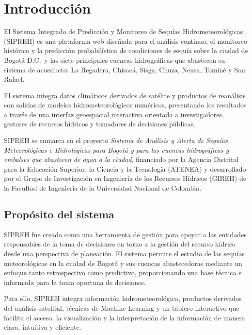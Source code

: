 \chapter{Introducción}
\label{ch:introduccion}

El Sistema Integrado de Predicción y Monitoreo de Sequías Hidrometeorológicas (SIPREH) es una plataforma web diseñada para el análisis continuo, el monitoreo histórico y la predicción probabilística de condiciones de sequía sobre la ciudad de Bogotá D.C.\ y las siete principales cuencas hidrográficas que abastecen su sistema de acueducto: La Regadera, Chisacá, Sisga, Chuza, Neusa, Tominé y San Rafael.

El sistema integra datos climáticos derivados de satélite y productos de reanálisis con salidas de modelos hidrometeorológicos numéricos, presentando los resultados a través de una interfaz geoespacial interactiva orientada a investigadores, gestores de recursos hídricos y tomadores de decisiones públicas.

SIPREH se enmarca en el proyecto \textit{Sistema de Análisis y Alerta de Sequías Meteorológicas e Hidrológicas para Bogotá y para las cuencas hidrográficas y embalses que abastecen de agua a la ciudad}, financiado por la Agencia Distrital para la Educación Superior, la Ciencia y la Tecnología (ATENEA) y desarrollado por el Grupo de Investigación en Ingeniería de los Recursos Hídricos (GIREH) de la Facultad de Ingeniería de la Universidad Nacional de Colombia.

\section{Propósito del sistema}
\label{sec:proposito}

SIPREH fue creado como una herramienta de gestión para apoyar a las entidades responsables de la toma de decisiones en torno a la gestión del recurso hídrico desde una perspectiva de planeación. El sistema permite el estudio de las sequías meteorológicas en la ciudad de Bogotá y sus cuencas abastecedoras mediante un enfoque tanto retrospectivo como predictivo, proporcionando una base técnica e informada para la toma oportuna de decisiones.

Para ello, SIPREH integra información hidrometeorológica, productos derivados del análisis satelital, técnicas de Machine Learning y un tablero interactivo que facilita el acceso, la visualización y la interpretación de la información de manera clara, intuitiva y eficiente.

